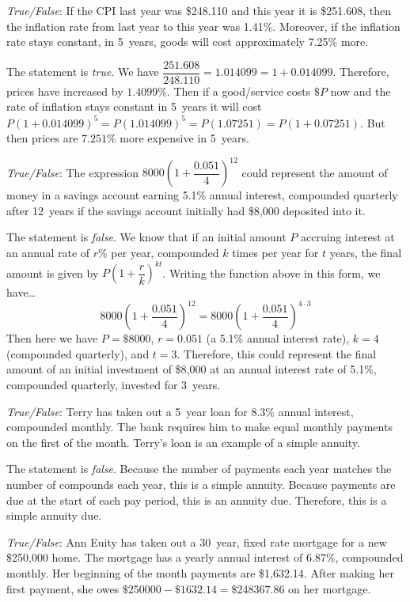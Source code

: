 \documentclass[11pt,letterpaper]{article}
\begin{document}
\quizsol \textit{True/False}: If the CPI last year was \$248.110 and this year it is \$251.608, then the inflation rate from last year to this year was 1.41\%. Moreover, if the inflation rate stays constant, in 5~years, goods will cost approximately 7.25\% more. \pspace

\sol The statement is \textit{true}. We have $\dfrac{251.608}{248.110}= 1.014099= 1 + 0.014099$. Therefore, prices have increased by $1.4099\%$. Then if a good/service costs $\$P$ now and the rate of inflation stays constant in 5~years it will cost $P(1 + 0.014099)^5= P(1.014099)^5= P(1.07251)= P(1 + 0.07251)$. But then prices are $7.251\%$ more expensive in 5~years. \pvspace{1.3cm}



\quizsol \textit{True/False}: The expression $8000 \left(1 + \dfrac{0.051}{4} \right)^{12}$ could represent the amount of money in a savings account earning 5.1\% annual interest, compounded quarterly after 12~years if the savings account initially had \$8,000 deposited into it. \pspace

\sol The statement is \textit{false}. We know that if an initial amount $P$ accruing interest at an annual rate of $r$\% per year, compounded $k$ times per year for $t$ years, the final amount is given by $P \left(1 + \dfrac{r}{k} \right)^{kt}$. Writing the function above in this form, we have\dots
	\[
	8000 \left(1 + \dfrac{0.051}{4} \right)^{12}= 8000 \left(1 + \dfrac{0.051}{4} \right)^{4 \cdot 3}
	\]
Then here we have $P= \$8000$, $r= 0.051$ (a 5.1\% annual interest rate), $k= 4$ (compounded quarterly), and $t= 3$. Therefore, this could represent the final amount of an initial investment of \$8,000 at an annual interest rate of 5.1\%, compounded quarterly, invested for 3~years. \pvspace{1.5cm}



\quizsol \textit{True/False}: Terry has taken out a 5~year loan for 8.3\% annual interest, compounded monthly. The bank requires him to make equal monthly payments on the first of the month. Terry's loan is an example of a simple annuity. \pspace

\sol The statement is \textit{false}. Because the number of payments each year matches the number of compounds each year, this is a simple annuity. Because payments are due at the start of each pay period, this is an annuity due. Therefore, this is a simple annuity due. \pvspace{1.5cm}



\quizsol \textit{True/False}: Ann Euity has taken out a 30~year, fixed rate mortgage for a new \$250,000 home. The mortgage has a yearly annual interest of 6.87\%, compounded monthly. Her beginning of the month payments are \$1,632.14. After making her first payment, she owes $\$250000 - \$1632.14= \$248367.86$ on her mortgage. \pspace
\end{document}
